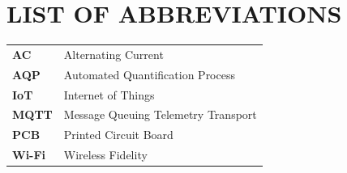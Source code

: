 \documentclass[../main.tex]{subfiles}
\begin{document}
\section*{LIST OF ABBREVIATIONS}

\vspace{1em}

\begin{tabular}{@{}ll}
\textbf{AC}     & Alternating Current \\
\textbf{AQP}    & Automated Quantification Process \\
\textbf{IoT}    & Internet of Things \\
\textbf{MQTT}   & Message Queuing Telemetry Transport \\
\textbf{PCB}    & Printed Circuit Board \\
\textbf{Wi-Fi}  & Wireless Fidelity \\
\end{tabular}
\end{document}
